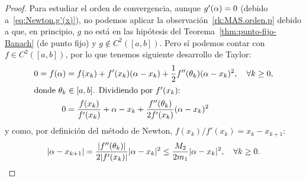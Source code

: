 \begin{proof}
  Para estudiar el orden de convergencia, aunque $g'(\alpha)=0$ (debido
  a~\eqref{eq:Newton.g'(x)}), no podemos aplicar la
  observación~\ref{rk:MAS.orden.p} debido a que, en principio, $g$ no
  está en las hipótesis del Teorema~\ref{thm:punto-fijo-Banach} (de
  punto fijo) y $g\not\in C^2([a,b])$. Pero sí podemos contar con
  $f\in C^2([a,b])$, por lo que tenemos siguiente desarrollo de
  Taylor:
  \begin{align*}
    0 = f(\alpha)&=f(x_k)+f'(x_k)(\alpha-x_k)+\frac12 f''(\theta_k)(\alpha-x_k)^2,
                  \quad\forall k\ge 0,
    \\
    \intertext{donde $\theta_k\in [a,b]$. Dividiendo por $f'(x_k)$:}
    0 &=  \frac{f(x_k)}{f'(x_k)} + \alpha - x_k + \frac{f''(\theta_k)}{2f'(x_k)}(\alpha-x_k)^2
  \end{align*}
  y como, por definición del método de Newton,
  $f(x_k)/f'(x_k)=x_k-x_{k+1}$:
  \begin{equation*}
    |\alpha-x_{k+1}| =  \frac{|f''(\theta_k)|}{2|f'(x_k)|}|\alpha-x_k|^2 \le \frac{M_2}{2m_1} |\alpha-x_k|^2,
    \quad\forall k\ge 0.
  \end{equation*}
\end{proof}

